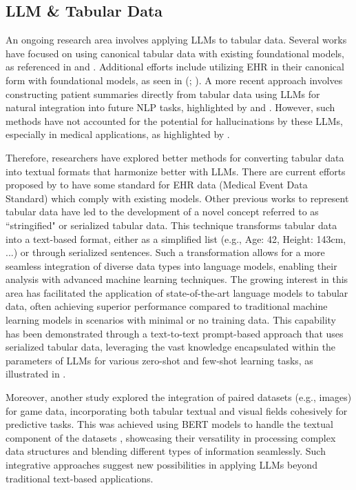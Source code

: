 \documentclass{article}
\theoremstyle{plain}
\theoremstyle{definition}
\theoremstyle{remark}
\begin{document}
\subsection{LLM \& Tabular Data}

An ongoing research area involves applying LLMs to tabular data. Several works have focused on using canonical tabular data with existing foundational models, as referenced in \citep{zhang2023towards} and \citep{slack2023tablet}. Additional efforts include utilizing EHR in their canonical form with foundational models, as seen in (\cite{shi2024ehragent}; \cite{wang2023meditab}). A more recent approach involves constructing patient summaries directly from tabular data using LLMs for natural integration into future NLP tasks, highlighted by \citep{ellershaw2024automated} and \citep{hegselmann2024data}. However, such methods have not accounted for the potential for hallucinations by these LLMs, especially in medical applications, as highlighted by \citep{lee2024large}.

Therefore, researchers have explored better methods for converting tabular data into textual formats that harmonize better with LLMs. There are current efforts proposed by \citep{arnrich2024medical} to have some standard for EHR data (Medical Event Data Standard) which comply with existing models. Other previous works \citep{hegselmann2023tabllm}to represent tabular data have led to the development of a novel concept referred to as ``stringified" or serialized tabular data. This technique transforms tabular data into a text-based format, either as a simplified list (e.g., Age: 42, Height: 143cm, ...) or through serialized sentences. Such a transformation allows for a more seamless integration of diverse data types into language models, enabling their analysis with advanced machine learning techniques. The growing interest in this area has facilitated the application of state-of-the-art language models to tabular data, often achieving superior performance compared to traditional machine learning models in scenarios with minimal or no training data. This capability has been demonstrated through a text-to-text prompt-based approach that uses serialized tabular data, leveraging the vast knowledge encapsulated within the parameters of LLMs for various zero-shot and few-shot learning tasks, as illustrated in \citep{hegselmann2023tabllm}. 

Moreover, another study explored the integration of paired datasets (e.g., images) for game data, incorporating both tabular textual and visual fields cohesively for predictive tasks. This was achieved using BERT models to handle the textual component of the datasets \citep{lu2023MuG}, showcasing their versatility in processing complex data structures and blending different types of information seamlessly. Such integrative approaches suggest new possibilities in applying LLMs beyond traditional text-based applications.
\end{document}
